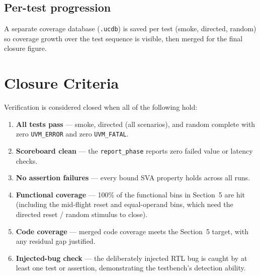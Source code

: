 \documentclass[11pt,a4paper]{article}
\begin{document}
\subsection*{Per-test progression}
A separate coverage database (\texttt{.ucdb}) is saved per test (smoke, directed,
random) so coverage growth over the test sequence is visible, then merged for the
final closure figure.

\section{Closure Criteria}

Verification is considered closed when all of the following hold:

\begin{enumerate}
    \item \textbf{All tests pass} --- smoke, directed (all scenarios), and random complete with zero \texttt{UVM\_ERROR} and zero \texttt{UVM\_FATAL}.
    \item \textbf{Scoreboard clean} --- the \texttt{report\_phase} reports zero failed value or latency checks.
    \item \textbf{No assertion failures} --- every bound SVA property holds across all runs.
    \item \textbf{Functional coverage} --- 100\% of the functional bins in Section~5 are hit (including the mid-flight reset and equal-operand bins, which need the directed reset / random stimulus to close).
    \item \textbf{Code coverage} --- merged code coverage meets the Section~5 target, with any residual gap justified.
    \item \textbf{Injected-bug check} --- the deliberately injected RTL bug is caught by at least one test or assertion, demonstrating the testbench's detection ability.
\end{enumerate}
\end{document}
